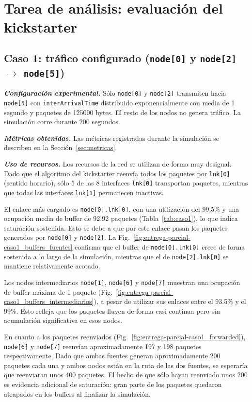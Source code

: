 \documentclass[10pt,letterpaper,twocolumn]{article}
\begin{document}
\FloatBarrier

\section{Tarea de análisis: evaluación del kickstarter}
\label{sec:analisis}

\subsection{Caso 1: tráfico configurado (\texttt{node[0]} y \texttt{node[2]} $\rightarrow$ \texttt{node[5]})}

\textbf{\textit{Configuración experimental.}} Sólo \texttt{node[0]} y \texttt{node[2]} transmiten hacia \texttt{node[5]} con \texttt{interArrivalTime} distribuido exponencialmente con media de 1 segundo y paquetes de 125000 bytes. El resto de los nodos no genera tráfico. La simulación corre durante 200 segundos.

\textbf{\textit{Métricas obtenidas.}} Las métricas registradas durante la simulación se describen en la Sección~\ref{sec:metricas}.

\textbf{\textit{Uso de recursos.}} Los recursos de la red se utilizan de forma muy desigual. Dado que el algoritmo del kickstarter reenvía todos los paquetes por \texttt{lnk[0]} (sentido horario), sólo 5 de las 8 interfaces \texttt{lnk[0]} transportan paquetes, mientras que todas las interfaces \texttt{lnk[1]} permanecen inactivas.

El enlace más cargado es \texttt{node[0].lnk[0]}, con una utilización del 99.5\% y una ocupación media de buffer de 92.92 paquetes (Tabla~\ref{tab:caso1}), lo que indica saturación sostenida. Esto se debe a que por este enlace pasan los paquetes generados por \texttt{node[0]} y \texttt{node[2]}. La Fig.~\ref{fig:entrega-parcial-caso1_buffers_fuentes} confirma que el buffer de \texttt{node[0].lnk[0]} crece de forma sostenida a lo largo de la simulación, mientras que el de \texttt{node[2].lnk[0]} se mantiene relativamente acotado.

Los nodos intermediarios \texttt{node[1]}, \texttt{node[6]} y \texttt{node[7]} muestran una ocupación de buffer máxima de 1 paquete (Fig.~\ref{fig:entrega-parcial-caso1_buffers_intermediarios}), a pesar de utilizar sus enlaces entre el 93.5\% y el 99\%. Esto refleja que los paquetes fluyen de forma casi continua pero sin acumulación significativa en esos nodos.

En cuanto a los paquetes reenviados (Fig.~\ref{fig:entrega-parcial-caso1_forwarded}), \texttt{node[6]} y \texttt{node[7]} reenvían aproximadamente 197 y 198 paquetes respectivamente. Dado que ambas fuentes generan aproximadamente 200 paquetes cada una y ambos nodos están en la ruta de las dos fuentes, se esperaría que reenviaran unos 400 paquetes. El hecho de que sólo hayan reenviado unos 200 es evidencia adicional de saturación: gran parte de los paquetes quedaron atrapados en los buffers al finalizar la simulación.
\end{document}
